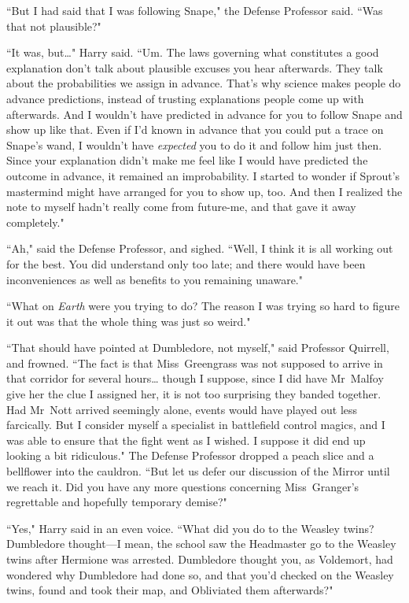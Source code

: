 ``But I had said that I was following Snape," the Defense Professor said. ``Was that not plausible?"

``It was, but{\ldots}" Harry said. ``Um. The laws governing what constitutes a good explanation don't talk about plausible excuses you hear afterwards. They talk about the probabilities we assign in advance. That's why science makes people do advance predictions, instead of trusting explanations people come up with afterwards. And I wouldn't have predicted in advance for you to follow Snape and show up like that. Even if I'd known in advance that you could put a trace on Snape's wand, I wouldn't have \emph{expected} you to do it and follow him just then. Since your explanation didn't make me feel like I would have predicted the outcome in advance, it remained an improbability. I started to wonder if Sprout's mastermind might have arranged for you to show up, too. And then I realized the note to myself hadn't really come from future-me, and that gave it away completely."

``Ah," said the Defense Professor, and sighed. ``Well, I think it is all working out for the best. You did understand only too late; and there would have been inconveniences as well as benefits to you remaining unaware."

``What on \emph{Earth} were you trying to do? The reason I was trying so hard to figure it out was that the whole thing was just so weird."

``That should have pointed at Dumbledore, not myself," said Professor Quirrell, and frowned. ``The fact is that Miss~Greengrass was not supposed to arrive in that corridor for several hours{\ldots} though I suppose, since I did have Mr~Malfoy give her the clue I assigned her, it is not too surprising they banded together. Had Mr~Nott arrived seemingly alone, events would have played out less farcically. But I consider myself a specialist in battlefield control magics, and I was able to ensure that the fight went as I wished. I suppose it did end up looking a bit ridiculous." The Defense Professor dropped a peach slice and a bellflower into the cauldron. ``But let us defer our discussion of the Mirror until we reach it. Did you have any more questions concerning Miss~Granger's regrettable and hopefully temporary demise?"

``Yes," Harry said in an even voice. ``What did you do to the Weasley twins? Dumbledore thought—I mean, the school saw the Headmaster go to the Weasley twins after Hermione was arrested. Dumbledore thought you, as Voldemort, had wondered why Dumbledore had done so, and that you'd checked on the Weasley twins, found and took their map, and Obliviated them afterwards?"

